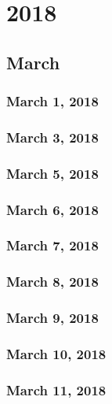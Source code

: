 \part{2018}
\chapter{March}
\section{March 1, 2018}




\section{March 3, 2018}

\section{March 5, 2018}


\section{March 6, 2018}


\section{March 7, 2018}


\section{March 8, 2018}




\section{March 9, 2018}

\section{March 10, 2018}

\section{March 11, 2018}

